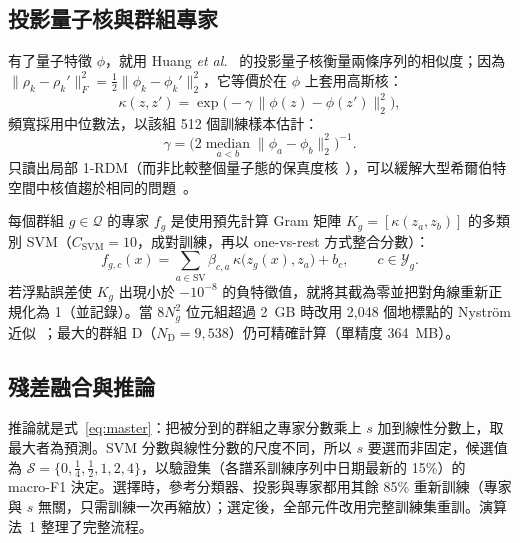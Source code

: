 \documentclass[10pt,a4paper]{article}
\begin{document}
\subsection{投影量子核與群組專家}
\label{sec:kernel}

有了量子特徵 $\phi$，就用 Huang \textit{et al.}~\cite{huang2021power} 的投影量子核衡量兩條序列的相似度；因為 $\|\rho_k-\rho_k'\|_F^2=\tfrac12\|\phi_k-\phi_k'\|_2^2$，它等價於在 $\phi$ 上套用高斯核：
\begin{equation}
    \kappa(z,z')=\exp\!\big(-\gamma\,\|\phi(z)-\phi(z')\|_2^2\big),
    \label{eq:pqk}
\end{equation}
頻寬採用中位數法，以該組 512 個訓練樣本估計：
\begin{equation}
    \gamma=\Big(2\operatorname*{median}_{a<b}\|\phi_a-\phi_b\|_2^2\Big)^{-1}.
    \label{eq:median-gamma}
\end{equation}
只讀出局部 1-RDM（而非比較整個量子態的保真度核~\cite{havlicek2019}），可以緩解大型希爾伯特空間中核值趨於相同的問題~\cite{huang2021power}。

每個群組 $g\in\mathcal{Q}$ 的專家 $f_g$ 是使用預先計算 Gram 矩陣 $K_g=[\kappa(z_a,z_b)]$ 的多類別 SVM（$C_{\mathrm{SVM}}=10$，成對訓練，再以 one-vs-rest 方式整合分數）：
\begin{equation}
    f_{g,c}(x)=\sum_{a\in\mathrm{SV}}\beta_{c,a}\,\kappa\big(z_g(x),z_a\big)+b_c,\qquad c\in\mathcal{Y}_g.
    \label{eq:svm}
\end{equation}
若浮點誤差使 $K_g$ 出現小於 $-10^{-8}$ 的負特徵值，就將其截為零並把對角線重新正規化為 1（並記錄）。當 $8N_g^2$ 位元組超過 2~GB 時改用 2,048 個地標點的 Nystr\"om 近似~\cite{williams2001nystrom}；最大的群組 D（$N_{\mathrm{D}}=9{,}538$）仍可精確計算（單精度 364~MB）。

\subsection{殘差融合與推論}
\label{sec:fusion}

推論就是式~\eqref{eq:master}：把被分到的群組之專家分數乘上 $s$ 加到線性分數上，取最大者為預測。SVM 分數與線性分數的尺度不同，所以 $s$ 要選而非固定，候選值為 $\mathcal{S}=\{0,\tfrac14,\tfrac12,1,2,4\}$，以驗證集（各譜系訓練序列中日期最新的 15\%）的 macro-F1 決定。選擇時，參考分類器、投影與專家都用其餘 85\% 重新訓練（專家與 $s$ 無關，只需訓練一次再縮放）；選定後，全部元件改用完整訓練集重訓。演算法~1 整理了完整流程。
\end{document}
